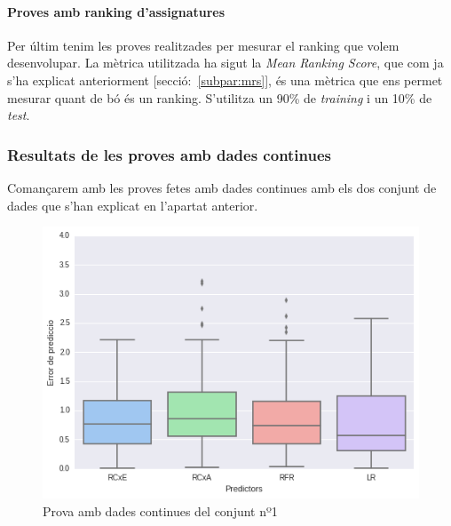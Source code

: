 \documentclass[12pt,a4paper,catalan]{article}
\begin{document}
\paragraph{Proves amb ranking d'assignatures}
Per últim tenim les proves realitzades per mesurar el ranking que volem desenvolupar. La mètrica utilitzada ha sigut la \textit{Mean Ranking Score}, que com ja s'ha explicat anteriorment [secció:~\ref{subpar:mrs}], és una mètrica que ens permet mesurar quant de bó és un ranking. S'utilitza un 90\% de \textit{training} i un 10\% de \textit{test}.

\subsubsection{Resultats de les proves amb dades continues}
Comançarem amb les proves fetes amb dades continues amb els dos conjunt de dades que s'han explicat en l'apartat anterior.
\\
\begin{figure}[h]
\centering
\includegraphics[width=.7\linewidth]{img/boxplot_primer_segon.png}
\caption{Prova amb dades continues del conjunt nº1}
\label{fig:boxplotdctp}
\end{figure}
\end{document}
